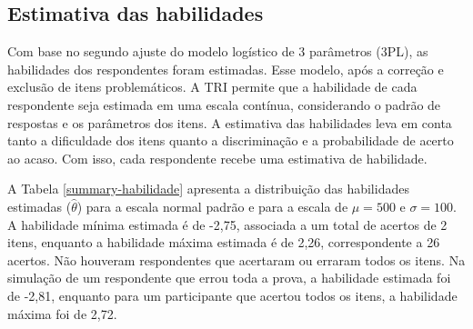 \subsection{Estimativa das habilidades}

Com base no segundo ajuste do modelo logístico de 3 parâmetros (3PL), as habilidades dos respondentes foram estimadas. Esse modelo, após a correção e exclusão de itens problemáticos. A TRI permite que a habilidade  de cada respondente seja estimada em uma escala contínua, considerando o padrão de respostas e os parâmetros dos itens. A estimativa das habilidades leva em conta tanto a dificuldade dos itens quanto a discriminação e a probabilidade de acerto ao acaso. Com isso, cada respondente recebe uma estimativa de habilidade.



\begin{table}[!hbt]
\end{table}

A Tabela \ref{summary-habilidade} apresenta a distribuição das habilidades estimadas ($\hat{\theta}$) para a escala normal padrão e para a escala  de $\mu = 500$ e $\sigma = 100$. A habilidade mínima estimada é de -2,75, associada a um total de acertos de 2 itens, enquanto a habilidade máxima estimada é de 2,26, correspondente a 26 acertos. Não houveram respondentes que acertaram ou erraram todos os itens. Na simulação de um respondente que errou toda a prova, a habilidade estimada foi de -2,81, enquanto para um participante que acertou todos os itens, a habilidade máxima foi de 2,72. 
\begin{comment}
	Vale lembrar que essas habilidades são expressas em uma escala com média 0 e desvio padrão 1. Caso fosse necessário aproximar os resultados dessa escala ao padrão utilizado no ENEM, seria preciso transformá-la para uma escala com média 500 e desvio padrão 100, conforme o procedimento descrito por \citeonline{inep2021procedimento}.
\end{comment}


